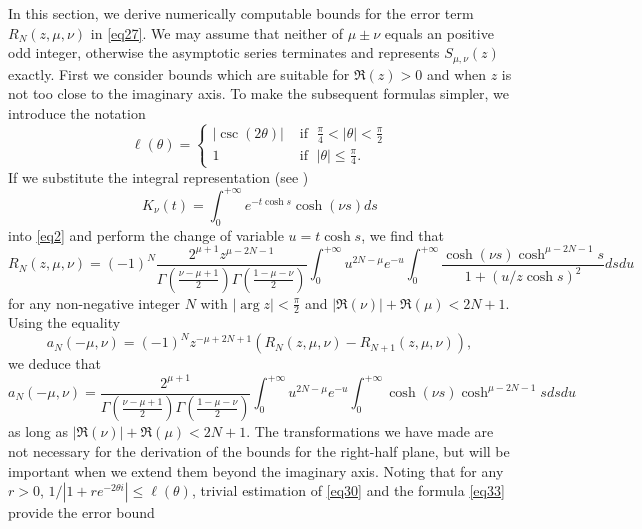 \documentclass[a4paper,twoside,10pt]{amsart}
\numberwithin{equation}{section}
\begin{document}
In this section, we derive numerically computable bounds for the error term $R_N \left( {z,\mu ,\nu } \right)$ in \eqref{eq27}. We may assume that neither of $\mu\pm\nu$ equals an positive odd integer, otherwise the asymptotic series terminates and represents $S_{\mu ,\nu } \left( z \right)$ exactly. First we consider bounds which are suitable for $\Re\left(z\right)>0$ and when $z$ is not too close to the imaginary axis. To make the subsequent formulas simpler, we introduce the notation
\begin{equation}\label{eq40}
\ell \left( \theta  \right) = \begin{cases} \left|\csc\left(2\theta\right)\right| & \text{ if } \; \frac{\pi}{4} < \left|\theta\right| <\frac{\pi}{2} \\ 1 & \text{ if } \; \left|\theta\right| \leq \frac{\pi}{4} . \end{cases}
\end{equation}
If we substitute the integral representation (see \cite[10.32.E9]{NIST})
\[
K_\nu  \left( t \right) = \int_0^{ + \infty } {e^{ - t\cosh s} \cosh \left( {\nu s} \right)ds} 
\]
into \eqref{eq2} and perform the change of variable $u = t\cosh s$, we find that
\begin{equation}\label{eq30}
R_N \left( {z,\mu ,\nu } \right) = \left( { - 1} \right)^N \frac{{2^{\mu  + 1} z^{\mu  - 2N - 1} }}{{\Gamma \left( {\frac{{\nu  - \mu  + 1}}{2}} \right)\Gamma \left( {\frac{{1 - \mu  - \nu }}{2}} \right)}}\int_0^{ + \infty } {u^{2N - \mu } e^{ - u} \int_0^{ + \infty } {\frac{{\cosh \left( {\nu s} \right)\cosh ^{\mu - 2N - 1} s}}{{1 + \left( {u/z\cosh s} \right)^2 }}ds} du} 
\end{equation}
for any non-negative integer $N$ with $\left|\arg z\right| < \frac{\pi}{2}$ and $\left| {\Re \left( \nu  \right)} \right| + \Re \left( \mu  \right) < 2N + 1$. Using the equality
\[
a_N \left( { - \mu ,\nu } \right) = \left( { - 1} \right)^N z^{ - \mu  + 2N + 1} \left( {R_N \left( {z,\mu ,\nu } \right) - R_{N + 1} \left( {z,\mu ,\nu } \right)} \right),
\]
we deduce that
\begin{equation}\label{eq33}
a_N \left( { - \mu ,\nu } \right) = \frac{{2^{\mu  + 1} }}{{\Gamma \left( {\frac{{\nu  - \mu  + 1}}{2}} \right)\Gamma \left( {\frac{{1 - \mu  - \nu }}{2}} \right)}}\int_0^{ + \infty } {u^{2N - \mu } e^{ - u} \int_0^{ + \infty } {\cosh \left( {\nu s} \right)\cosh ^{\mu  - 2N - 1} sds} du} 
\end{equation}
as long as $\left| {\Re \left( \nu  \right)} \right| + \Re \left( \mu  \right) < 2N + 1$. The transformations we have made are not necessary for the derivation of the bounds for the right-half plane, but will be important when we extend them beyond the imaginary axis. Noting that for any $r>0$, $1/\left| {1 + re^{ - 2\theta i} } \right| \le \ell \left( \theta  \right)$, trivial estimation of \eqref{eq30} and the formula \eqref{eq33} provide the error bound
\end{document}
